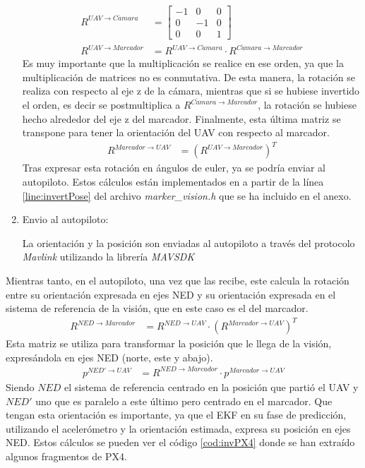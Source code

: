 \begin{enumerate}
	\begin{align}
	R^{UAV\rightarrow C\acute{a}mara}& = \begin{bmatrix} -1 & 0 & 0\\ 0 & -1 & 0 \\ 0 & 0 & 1 \end{bmatrix}\\
	R^{UAV \rightarrow Marcador}& = R^{UAV\rightarrow C\acute{a}mara}\cdot R^{C\acute{a}mara\rightarrow Marcador}
	\end{align}
Es muy importante que la multiplicación se realice en ese orden, ya que la multiplicación de matrices no es conmutativa. De esta manera, la rotación se realiza con respecto al eje z de la cámara, mientras que si se hubiese invertido el orden, es decir se postmultiplica a $R^{C\acute{a}mara\rightarrow Marcador}$, la rotación se hubiese hecho alrededor del eje z del marcador.
	Finalmente, esta última matriz se transpone para tener la orientación del UAV con respecto al marcador.
	\begin{align}
	R^{Marcador \rightarrow UAV}& = \left(R^{UAV \rightarrow Marcador}\right)^T
	\end{align}
	Tras expresar esta rotación en ángulos de euler, ya se podría enviar al autopiloto.
	Estos cálculos están implementados en a partir de la línea \ref{line:invertPose} del archivo \textit{marker\_vision.h} que se ha incluido en el anexo.


	
\item Envio al autopiloto: 

	La orientación y la posición son enviadas al autopiloto a través del protocolo \textit{Mavlink} utilizando la librería \textit{MAVSDK}

\end{enumerate}

Mientras tanto, en el autopiloto, una vez que las recibe, este calcula la rotación entre su orientación expresada en ejes NED y su orientación expresada en el sistema de referencia de la visión, que en este caso es el del marcador. 
\begin{align}
R^{NED \rightarrow Marcador}& =  R^{NED \rightarrow UAV} \cdot  \left(R^{Marcador \rightarrow UAV}\right)^T
\end{align}
Esta matriz se utiliza para transformar la posición que le llega de la visión, expresándola en ejes NED (norte, este y abajo).
\begin{align}
p^{NED' \rightarrow UAV}& = R^{NED \rightarrow Marcador} \cdot p^{Marcador \rightarrow UAV}
\end{align}
Siendo $NED$ el sistema de referencia centrado en la posición que partió el UAV y $NED'$ uno que es paralelo a este último pero centrado en el marcador.
Que tengan esta orientación es importante, ya que el EKF en su fase de predicción, utilizando el acelerómetro y la orientación estimada, expresa su posición en ejes NED.
Estos cálculos se pueden ver el código \ref{cod:invPX4} donde se han extraído algunos fragmentos de PX4. 

